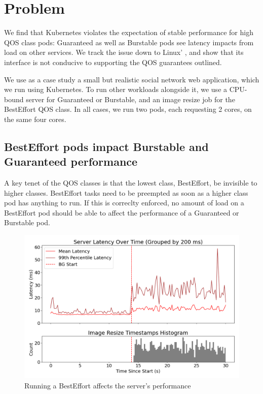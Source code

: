 \section{Problem}\label{s:problem}

We find that Kubernetes violates the expectation of stable performance for high
QOS class pods: Guaranteed as well as Burstable pods see latency impacts from
load on other services. We track the issue down to Linux' \cgroups{}, and show
that its interface is not conducive to supporting the QOS guarantees outlined.

We use as a case study a small but realistic social network web application,
which we run using Kubernetes. To run other workloads alongside it, we use a
CPU-bound server for Guaranteed or Burstable, and an image resize job for the
BestEffort QOS class. In all cases, we run two pods, each requesting 2 cores, on
the same four cores.


\subsection{BestEffort pods impact Burstable and Guaranteed performance}

A key tenet of the QOS classes is that the lowest class, BestEffort, be
invisible to higher classes. BestEffort tasks need to be preempted as soon as a
higher class pod has anything to run. If this is correclty enforced, no amount
of load on a BestEffort pod should be able to affect the performance of a
Guaranteed or Burstable pod.


\begin{figure}[t]
    \centering
    \includegraphics[width=\columnwidth]{graphs/kubernetes-unedited.png}
    \caption{Running a BestEffort affects the server's
    performance}\label{fig:kubernetes-unedited}
\end{figure}

